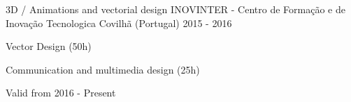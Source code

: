 

\begin{cventries}

  \cventry
    {3D / Animations and vectorial design} %
    {INOVINTER - Centro de Formação e de Inovação Tecnologica} %
    {Covilhã (Portugal)} %
    {2015 - 2016} %
    {
	    \begin{cvitems} %
        \item {Vector Design (50h)         } %
        \item {Communication and multimedia design (25h)} %
        \item {Valid from 2016 - Present} %
      \end{cvitems}
    }   
    \vspace{5cm}

\end{cventries}